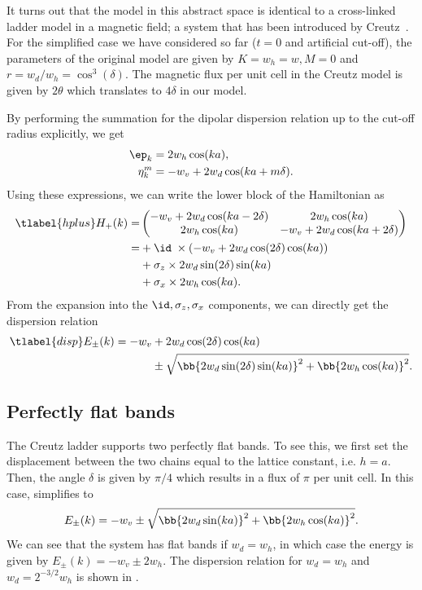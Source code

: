 It turns out that the model in this abstract space is identical to a cross-linked ladder model in a magnetic field; a system that has been introduced by Creutz~\cite{Creutz1999}.
For the simplified case we have considered so far ($t=0$ and artificial cut-off), the parameters of the original model are given by $K=w_h=w, M=0$ and $r=w_d/w_h=\cos^3(\delta)$.
The magnetic flux per unit cell in the Creutz model is given by $2\theta$ which translates to $4\delta$ in our model.

By performing the summation for the dipolar dispersion relation up to the cut-off radius explicitly, we get
\begin{align}
    \ep_k &= 2 w_h \cos(ka), \\
    \eta_k^m &= -w_v + 2 w_d \cos(ka + m\delta).
\end{align}
Using these expressions, we can write the lower block of the Hamiltonian as
\begin{align} \tlabel{hplus}
    H_+(k) = &\begin{pmatrix}
        -w_v + 2w_d \cos(ka-2\delta) & 2w_h \cos(ka) \\
        2w_h\cos(ka) & -w_v + 2w_d \cos(ka+2\delta)
    \end{pmatrix} \\
    = &+\id \; \times (-w_v + 2w_d \cos(2\delta) \cos(ka)) \\
    &+\sigma_z \times 2w_d \sin(2\delta) \sin(ka) \\
    &+\sigma_x \times 2w_h \cos(ka).
\end{align}
From the expansion into the $\id, \sigma_z, \sigma_x$ components, we can directly get the dispersion relation
\begin{align} \tlabel{disp}
    E_\pm(k) = -w_v &+ 2w_d \cos(2\delta)\cos(ka) \\
                    &\pm \sqrt{ \bb{ 2w_d\sin(2\delta)\sin(ka) }^2 + \bb{ 2w_h\cos(ka) }^2 }.
\end{align}

\subsection{Perfectly flat bands}
The Creutz ladder supports two perfectly flat bands. To see this, we first set the displacement between the two chains equal to the lattice constant, i.e. $h=a$.
Then, the angle $\delta$ is given by $\pi/4$ which results in a flux of $\pi$ per unit cell.
In this case,  simplifies to
\begin{align}
    E_\pm(k) = -w_v \pm \sqrt{ \bb{ 2w_d\sin(ka) }^2 + \bb{ 2w_h\cos(ka) }^2 }.
\end{align}
We can see that the system has flat bands if $w_d = w_h$, in which case the energy is given by $E_\pm(k) = -w_v \pm 2 w_h$.
The dispersion relation for $w_d=w_h$ and $w_d = 2^{-3/2} w_h$ is shown in .

